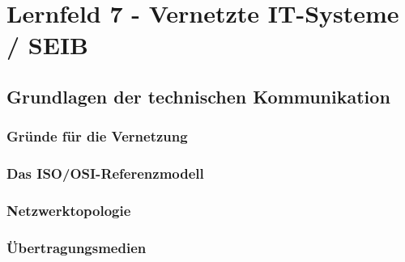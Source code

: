 \section{Lernfeld 7 - Vernetzte IT-Systeme / SEIB} %

\subsection{Grundlagen der technischen Kommunikation}
\subsubsection{Gründe für die Vernetzung}
\subsubsection{Das ISO/OSI-Referenzmodell}
\subsubsection{Netzwerktopologie}
\subsubsection{Übertragungsmedien}